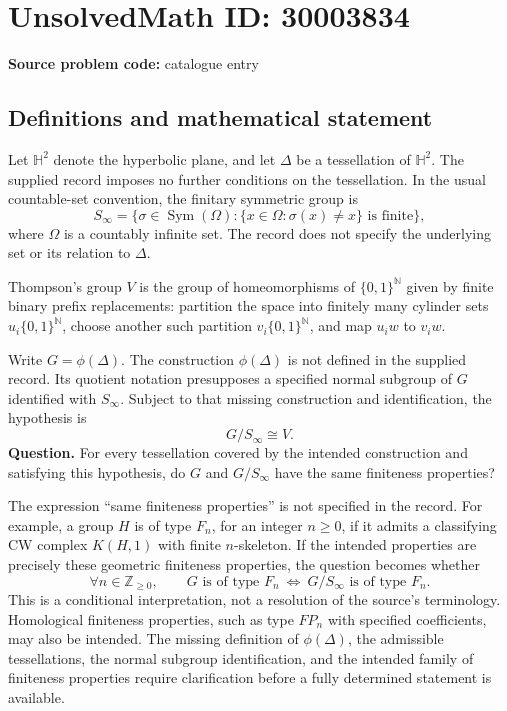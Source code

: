 \documentclass[11pt]{article}
\newcommand{\N}{\mathbb{N}}
\newcommand{\Z}{\mathbb{Z}}
\begin{document}
\section*{UnsolvedMath ID: 30003834}
\textbf{Source problem code:} catalogue entry
\subsection{Definitions and mathematical statement}
Let \(\mathbb H^2\) denote the hyperbolic plane, and let \(\Delta\) be a tessellation of \(\mathbb H^2\). The supplied record imposes no further conditions on the tessellation. In the usual countable-set convention, the finitary symmetric group is
\[
S_\infty=\{\sigma\in\operatorname{Sym}(\Omega):\{x\in\Omega:\sigma(x)\ne x\}\text{ is finite}\},
\]
where \(\Omega\) is a countably infinite set. The record does not specify the underlying set or its relation to \(\Delta\).

Thompson's group \(V\) is the group of homeomorphisms of \(\{0,1\}^{\N}\) given by finite binary prefix replacements: partition the space into finitely many cylinder sets \(u_i\{0,1\}^{\N}\), choose another such partition \(v_i\{0,1\}^{\N}\), and map \(u_iw\) to \(v_iw\).

Write \(G=\phi(\Delta)\). The construction \(\phi(\Delta)\) is not defined in the supplied record. Its quotient notation presupposes a specified normal subgroup of \(G\) identified with \(S_\infty\). Subject to that missing construction and identification, the hypothesis is
\[
G/S_\infty\cong V.
\]
\textbf{Question.} For every tessellation covered by the intended construction and satisfying this hypothesis, do \(G\) and \(G/S_\infty\) have the same finiteness properties?

The expression ``same finiteness properties'' is not specified in the record. For example, a group \(H\) is of type \(F_n\), for an integer \(n\geq0\), if it admits a classifying CW complex \(K(H,1)\) with finite \(n\)-skeleton. If the intended properties are precisely these geometric finiteness properties, the question becomes whether
\[
\forall n\in\Z_{\geq0},\qquad
G\text{ is of type }F_n
\ \Longleftrightarrow\
G/S_\infty\text{ is of type }F_n.
\]
This is a conditional interpretation, not a resolution of the source's terminology. Homological finiteness properties, such as type \(FP_n\) with specified coefficients, may also be intended. The missing definition of \(\phi(\Delta)\), the admissible tessellations, the normal subgroup identification, and the intended family of finiteness properties require clarification before a fully determined statement is available.
\end{document}
